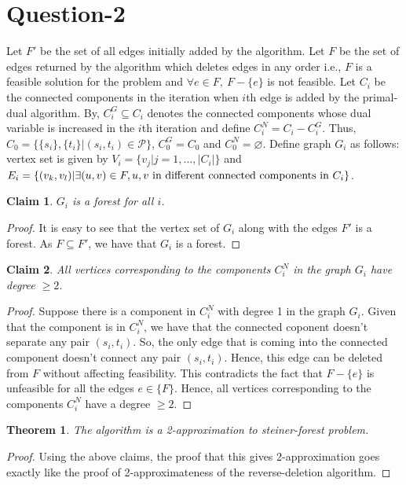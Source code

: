 \documentclass{article}
\newtheorem{theorem}{Theorem}
\newtheorem{claim}{Claim}
\newcommand{\set}[1]{\{#1\}}
\begin{document}
\section*{Question-2}
Let $F'$ be the set of all edges initially added by the algorithm. Let $F$ be the set of edges returned by the algorithm which deletes edges in any order i.e., $F$ is a feasible solution for the problem and $\forall e \in F,\  F - \set{e}$ is not feasible. Let $C_i$ be the
connected components in the iteration when $i$th edge is added by the primal-dual algorithm. By, $C_{i}^G \subseteq C_{i}$ denotes the connected components whose
dual variable is increased in the $i$th iteration and define $C_{i}^N = C_{i} - C_{i}^G$. Thus, $C_{0} = \set{\set{s_i},\set{t_i}|(s_i,t_i) \in \mathcal{P}}$, $C_{0}^G = C_0$ and $C_{0}^N = \varnothing$. Define graph $G_i$ as follows: vertex set is given by $V_{i} = \set{v_j | j = 1,\ldots,|C_i|}$ and $E_{i} = \set{(v_k,v_l)|\exists (u,v) \in F, u,v \textup{ in different connected components in }C_i}$.

\begin{claim}
    $G_i$ is a forest for all $i$.
\end{claim}
\begin{proof}
    It is easy to see that the vertex set of $G_i$ along with the edges $F'$ is a forest. As $F \subseteq F'$, we have that $G_i$ is
    a forest.
\end{proof}
\begin{claim}
    All vertices corresponding to the components $C_i^N$ in the graph $G_i$ have degree $\ge 2$.
\end{claim}
\begin{proof}
    Suppose there is a component in $C_i^N$ with degree 1 in the graph $G_i$. Given that the component is in $C_i^N$, we have that the
    connected coponent doesn't separate any pair $(s_i,t_i)$. So, the only edge that is coming into the connected component doesn't connect 
    any pair $(s_i,t_i)$. Hence, this edge can be deleted from $F$ without affecting feasibility. This contradicts the fact that $F - \set{e}$ is unfeasible for all the 
    edges $e \in \set{F}$. Hence, all vertices corresponding to the components $C_i^N$ have a degree $\ge 2$.
\end{proof}
\begin{theorem}
    The algorithm is a 2-approximation to steiner-forest problem.
\end{theorem}
\begin{proof}
    Using the above claims, the proof that this gives 2-approximation goes exactly like the proof of 2-approximateness of the
    reverse-deletion algorithm.
    \end{proof}
\end{document}
